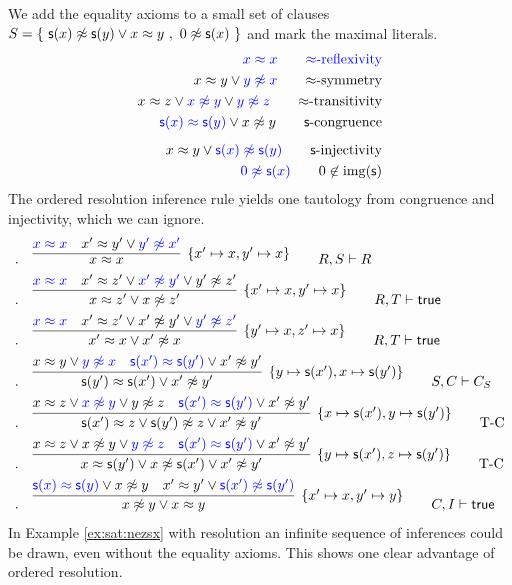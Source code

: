 \begin{example} 
	We add the equality axioms to a small set of clauses
	$S = \{\  \msucc(x)\mNE\msucc(y)\lor x\mEQ y\ ,\ 0\mNE \msucc(x) \ \}$ and mark the maximal literals.
	\begin{align*}
	\colN x \mEQ x
	\tag*{$\mEQ$-reflexivity}
	\\
	x \mEQ y \lor {\colN y \mNE x}
	\tag*{$\mEQ$-symmetry}
	\\
	x \mEQ z \lor {\colN x \mNE y} \lor {\colN y\mNE z}
	\tag*{$\mEQ$-transitivity}
	\\
	{\colN \msucc(x) \mEQ \msucc(y)} \lor x\mNE y
	\tag*{$\msucc$-congruence}
	\\[0.5em]
	x \mEQ y \lor {\colN \msucc(x) \mNE \msucc(y)}
	\tag*{$\msucc$-injectivity}
	\\
	{\colN 0 \mNE \msucc(x)}
	\tag*{$0\not\in\img(\msucc)$}
	\end{align*} 
	The ordered resolution inference rule yields one tautology from congruence and injectivity,
	which we can ignore. 
	\begin{align*}
.\quad&
\infer[\{x'\mapsto x, y'\mapsto x\}]
{x \mEQ x}
{{\colN x \mEQ x} & x' \mEQ y' \lor {\colN y' \mNE x'}}
\tag*{$R,S\proves R$}
\\
.\quad&
\infer[\{x'\mapsto x,y'\mapsto x \}]
{x\mEQ z'\lor x\mNE z'  }
{{\colN x \mEQ x} & x' \mEQ z' \lor {\colN x' \mNE y'} \lor {y'\mNE z'}}
\tag*{$R,T\proves\true$}
\\
.\quad&
\infer[\{y'\mapsto x, z'\mapsto x \}]
{x'\mEQ x\lor x'\mNE x  }
{{\colN x \mEQ x} & x' \mEQ z' \lor {x' \mNE y'} \lor {\colN y'\mNE z'}}
\tag*{$R,T\proves\true$}
\\
.\quad&
\infer[\{y\mapsto \msucc(x'), x\mapsto\msucc(y')\}]
{\msucc(y')\mEQ\msucc(x')\lor x'\mNE y'}
{x \mEQ y \lor {\colN y \mNE x} & {\colN \msucc(x') \mEQ \msucc(y')} \lor x'\mNE y'} 
\tag*{$S,C\proves C_S$}
\\
.\quad&
\infer[\{x\mapsto\msucc(x'),y\mapsto\msucc(y')\}]
{\msucc(x')\mEQ z\lor \msucc(y')\mNE z \lor x'\mNE y'}
{x \mEQ z \lor {\colN x \mNE y} \lor {y\mNE z} & {\colN \msucc(x') \mEQ \msucc(y')} \lor x'\mNE y'} 
\tag*{T-C}
\\
.\quad&
\infer[\{y\mapsto\msucc(x'),z\mapsto\msucc(y')\}]
{x\mEQ\msucc(y')\lor x\mNE\msucc(x')\lor x'\mNE y'}
{x \mEQ z \lor {x \mNE y} \lor {\colN y\mNE z} & {\colN \msucc(x') \mEQ \msucc(y')} \lor x'\mNE y'} 
\tag*{T-C}
\\
.\quad&
\infer[\{x'\mapsto x, y'\mapsto y\}]
{x\mNE y\lor x\mEQ y}
{{\colN \msucc(x) \mEQ \msucc(y)} \lor x\mNE y & x' \mEQ y' \lor {\colN \msucc(x') \mNE \msucc(y')}} 
\tag*{$C,I\proves\true$}
\\
	\end{align*}
	In Example \vref{ex:sat:nezsx} with resolution an infinite sequence of inferences could be drawn,
	even without the equality axioms.
	This shows one clear advantage of ordered resolution.
\end{example}

